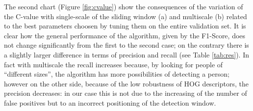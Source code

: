 \documentclass[a4paper,letterpaper, 11pt, onecolumn]{article} %
\begin{document}
The second chart (Figure \ref{fig:cvalue}) show the consequences of the variation of the C-value with single-scale of the sliding window (a) and multiscale (b) related to the best parameters choosen by tuning them on the entire validation set. It is clear how the general performance of the algorithm, given by the F1-Score, does not change significantly from the first to the second case; on the contrary there is a slightly larger difference in terms of precision and recall (see Table \ref{tab:res}). In fact with multiscale the recall increases because, by looking for people of ``different sizes'', the algorithm has more possibilities of detecting a person; however on the other side, because of the low robustness of HOG descriptors,  the precision decreases: in our case this is not due to the increasing of the number of false positives but to an incorrect positioning of the detection window. 
\end{document}
